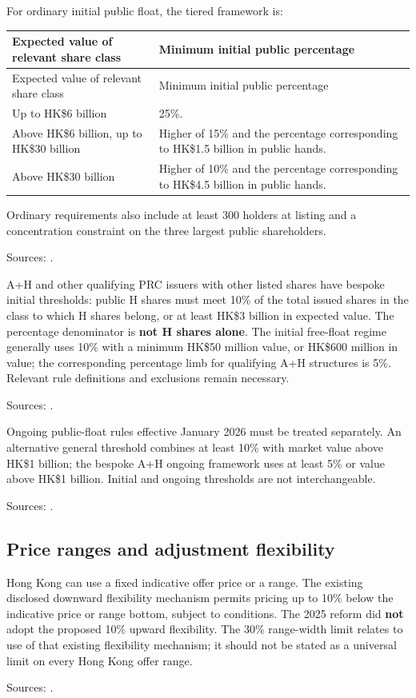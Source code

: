 \documentclass[11pt,a4paper]{article}
\newcommand{\source}[1]{\par{\footnotesize\color{ink}Sources: \cite{#1}.}\par}
\begin{document}
For ordinary initial public float, the tiered framework is:
\begin{longtable}{@{}L{6.0cm}L{9.5cm}@{}}
\toprule Expected value of relevant share class & Minimum initial public percentage\\\midrule\endfirsthead
\toprule Expected value of relevant share class & Minimum initial public percentage\\\midrule\endhead
Up to HK\$6 billion & 25\%.\\
Above HK\$6 billion, up to HK\$30 billion & Higher of 15\% and the percentage corresponding to HK\$1.5 billion in public hands.\\
Above HK\$30 billion & Higher of 10\% and the percentage corresponding to HK\$4.5 billion in public hands.\\
\bottomrule
\end{longtable}
Ordinary requirements also include at least 300 holders at listing and a concentration constraint on the three largest public shareholders.\source{floatrule}

A+H and other qualifying PRC issuers with other listed shares have bespoke initial thresholds: public H shares must meet 10\% of the total issued shares in the class to which H shares belong, or at least HK\$3 billion in expected value. The percentage denominator is \textbf{not H shares alone}. The initial free-float regime generally uses 10\% with a minimum HK\$50 million value, or HK\$600 million in value; the corresponding percentage limb for qualifying A+H structures is 5\%. Relevant rule definitions and exclusions remain necessary.\source{ipo2025pdf,freefloat}

Ongoing public-float rules effective January 2026 must be treated separately. An alternative general threshold combines at least 10\% with market value above HK\$1 billion; the bespoke A+H ongoing framework uses at least 5\% or value above HK\$1 billion. Initial and ongoing thresholds are not interchangeable.\source{ongoingfloat}

\subsection{Price ranges and adjustment flexibility}
Hong Kong can use a fixed indicative offer price or a range. The existing disclosed downward flexibility mechanism permits pricing up to 10\% below the indicative price or range bottom, subject to conditions. The 2025 reform did \textbf{not} adopt the proposed 10\% upward flexibility. The 30\% range-width limit relates to use of that existing flexibility mechanism; it should not be stated as a universal limit on every Hong Kong offer range.\source{ipo2025pdf}
\end{document}
